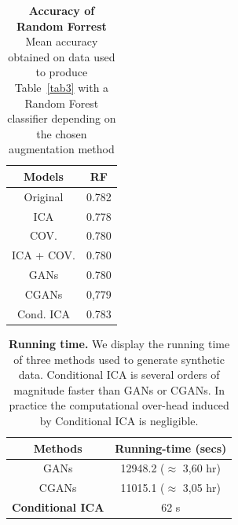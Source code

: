 \begin{table}
\begin{center}
\begin{tabular}{c|c|}
\hline
Models & RF \\
\hline
Original & 0.782 \\
ICA & 0.778 \\
COV. & 0.780 \\
ICA + COV. & 0.780 \\
GANs & 0.780 \\
CGANs & 0,779 \\
Cond. ICA & 0.783 \\
\hline\hline
\end{tabular}
\end{center}
\caption{\textbf{Accuracy of Random Forrest} Mean accuracy obtained on data used to produce Table~\ref{tab3} with a Random Forest classifier depending on the chosen augmentation method}\label{app:randomforrest}
\end{table}

\begin{table}
\begin{center}
\begin{tabular}{|c|c|}
\hline
Methods & Running-time (secs)
\\ \hline
GANs  & 12948.2 ($\approx$ 3,60 hr)
\\
CGANs  & 11015.1 ($\approx$ 3,05 hr)
\\
\textbf{Conditional ICA}  & 62 s 
\\
\hline
\end{tabular}
\end{center}
\caption{\textbf{Running time.} We display the running time of three methods used
  to generate synthetic data. Conditional ICA is several orders of magnitude faster than
  GANs or CGANs. In practice the computational over-head induced by Conditional ICA is negligible.}\label{app:runningtime:tab}
\end{table}



